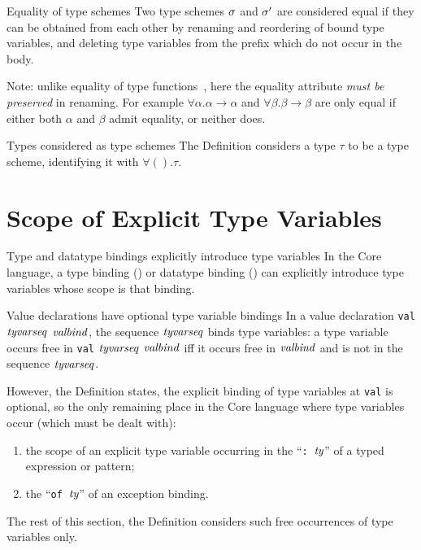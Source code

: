 \begin{clause}{Equality of type schemes}
Two type schemes $\sigma$ and $\sigma'$ are considered equal
if they can be obtained from each other by
renaming and reordering of bound type variables, and deleting type
variables from the prefix which do not occur in the body.

Note: unlike equality of type functions~, here the equality attribute
\emph{must be preserved} in renaming. For example $\forall\alpha.\alpha\to\alpha$
and $\forall\beta.\beta\to\beta$ are only equal if either both $\alpha$
and $\beta$ admit equality, or neither does.
\end{clause}

\begin{clause}{Types considered as type schemes}
The Definition considers a type $\tau$ to be a type scheme, identifying it with
$\forall().\tau$.
\end{clause}

\section{Scope of Explicit Type Variables}\label{sec:static-core:scope-of-explicit-type-variables}

\begin{clause}{Type and datatype bindings explicitly introduce type variables}
In the Core language, a type binding
(\hyperref[grammar:typbind]{}) or datatype binding (\hyperref[grammar:datbind]{}) can explicitly
introduce type variables whose scope is that binding.
\end{clause}

\begin{clause}{Value declarations have optional type variable bindings}
In a value declaration {\texttt{val} $\textit{tyvarseq\/}$ $\textit{valbind\/}$}, the sequence $\textit{tyvarseq\/}$ binds
type variables: a type variable occurs free in 
{\texttt{val} $\textit{tyvarseq\/}$ $\textit{valbind\/}$} iff it occurs free in $\textit{valbind\/}$
and is not in the sequence $\textit{tyvarseq\/}$.

However, the Definition states, the explicit binding of type variables
at \texttt{val} is optional, so the only remaining place in the Core
language where type variables occur (which must be dealt with):
\begin{enumerate}
\item the scope of an explicit type variable occurring in the
  ``\texttt{:}~$\textit{ty\/}$'' of a typed expression or pattern;
\item the ``\texttt{of}~$\textit{ty\/}$'' of an exception binding.
\end{enumerate}
The rest of this section, the Definition considers such free occurrences
of type variables only.
\end{clause}

